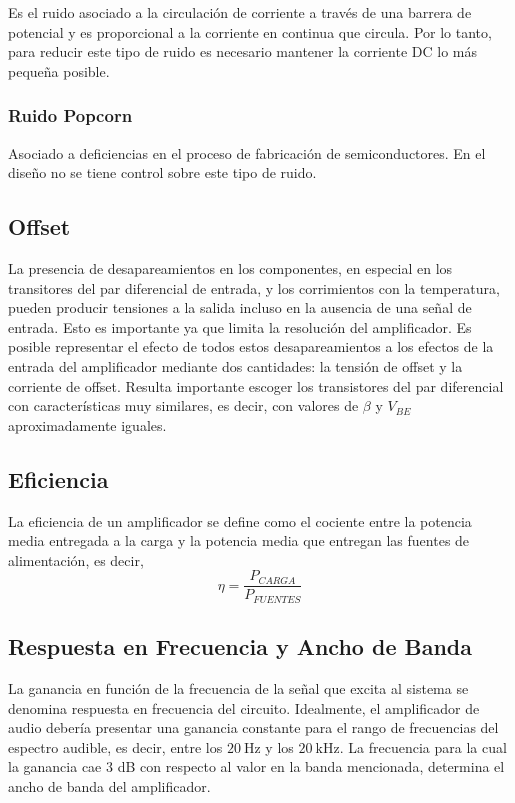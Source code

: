 \documentclass[a4paper,12pt,twoside]{article}
\newcommand{\Hz}{\ensuremath{~\mathrm{Hz}}}
\newcommand{\kHz}{\ensuremath{~\mathrm{kHz}}}
\begin{document}
Es el ruido asociado a la circulación de corriente a través de una barrera de potencial y es proporcional a la corriente en continua que circula. Por lo tanto, para reducir este tipo de ruido es necesario mantener la corriente DC lo más pequeña posible.

\subsubsection{Ruido Popcorn}

Asociado a deficiencias en el proceso de fabricación de semiconductores. En el diseño no se tiene control sobre este tipo de ruido.

\subsection{Offset}

La presencia de desapareamientos en los componentes, en especial en los transitores del par diferencial de entrada, y los corrimientos con la temperatura, pueden producir tensiones a la salida incluso en la ausencia de una señal de entrada. Esto es importante ya que limita la resolución del amplificador. Es posible representar el efecto de todos estos desapareamientos a los efectos de la entrada del amplificador mediante dos cantidades: la tensión de offset y la corriente de offset. Resulta importante escoger los transistores del par diferencial con características muy similares, es decir, con valores de $\beta$ y $V_{BE}$ aproximadamente iguales.

\subsection{Eficiencia}

La eficiencia de un amplificador se define como el cociente entre la potencia media entregada a la carga y la potencia media que entregan las fuentes de alimentación, es decir,
\begin{equation} \eta = \frac{P_{CARGA}}{P_{FUENTES}} \end{equation}

\subsection{Respuesta en Frecuencia y Ancho de Banda}

La ganancia en función de la frecuencia de la señal que excita al sistema se denomina respuesta en frecuencia del circuito. Idealmente, el amplificador de audio debería presentar una ganancia constante para el rango de frecuencias del espectro audible, es decir, entre los $20\Hz$ y los $20\kHz$. La frecuencia para la cual la ganancia cae $3$ dB con respecto al valor en la banda mencionada, determina el ancho de banda del amplificador.
\end{document}
